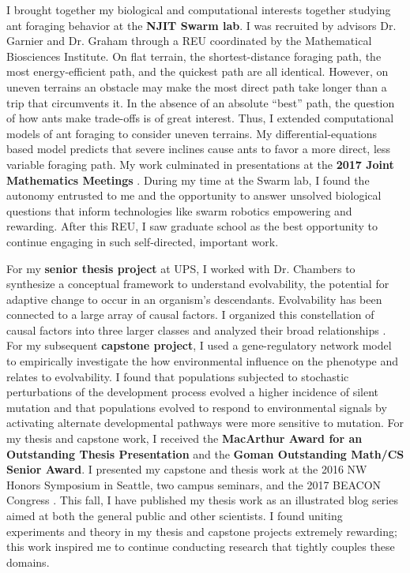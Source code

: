I brought together my biological and computational interests together studying ant foraging behavior at the \textbf{NJIT Swarm lab}.
I was recruited by advisors Dr. Garnier and Dr. Graham through a REU coordinated by the Mathematical Biosciences Institute.
On flat terrain, the shortest-distance foraging path, the most energy-efficient path, and the quickest path are all identical.
However, on uneven terrains an obstacle may make the most direct path take longer than a trip that circumvents it.
In the absence of an absolute ``best'' path, the question of how ants make trade-offs is of great interest.
Thus, I extended computational models of ant foraging to consider uneven terrains.
My differential-equations based model predicts that severe inclines cause ants to favor a more direct, less variable foraging path.
My work culminated in presentations at the \textbf{2017 Joint Mathematics Meetings} \cite{jmm}.
During my time at the Swarm lab, I found the autonomy entrusted to me and the opportunity to answer unsolved biological questions that inform technologies like swarm robotics empowering and rewarding.
After this REU, I saw graduate school as the best opportunity to continue engaging in such self-directed, important work.

For my \textbf{senior thesis project} at UPS, I worked with Dr. Chambers to synthesize a conceptual framework to understand evolvability, the potential for adaptive change to occur in an organism's descendants.
Evolvability has been connected to a large array of causal factors.
I organized this constellation of causal factors into three larger classes and analyzed their broad relationships \cite{thesis}.
For my subsequent \textbf{capstone project}, I used a gene-regulatory network model to empirically investigate the how environmental influence on the phenotype and relates to evolvability.
I found that populations subjected to stochastic perturbations of the development process evolved a higher incidence of silent mutation and that populations evolved to respond to environmental signals by activating alternate developmental pathways were more sensitive to mutation.
For my thesis and capstone work, I received the \textbf{MacArthur Award for an Outstanding Thesis Presentation} and the \textbf{Goman Outstanding Math/CS Senior Award}.
I presented my capstone and thesis work at the 2016 NW Honors Symposium in Seattle, two campus seminars, and the 2017 BEACON Congress \cite{beacon}.
This fall, I have published my thesis work as an illustrated blog series aimed at both the general public and other scientists.
I found uniting experiments and theory in my thesis and capstone projects extremely rewarding;
this work inspired me to continue conducting research that tightly couples these domains.
